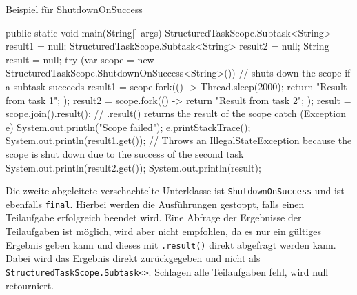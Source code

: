     \begin{program} [H]
        \caption{Beispiel für ShutdownOnSuccess}
        \label{prog:BeispielFürShutdownSuccess}
    \begin{JavaCode}[language=Java, numbers=left]
public static void main(String[] args) {
    StructuredTaskScope.Subtask<String> result1 = null;
    StructuredTaskScope.Subtask<String> result2 = null;
    String result = null;
    try (var scope = new StructuredTaskScope.ShutdownOnSuccess<String>()) {                 // shuts down the scope if a subtask succeeds
        result1 = scope.fork(() -> {
            Thread.sleep(2000);
            return "Result from task 1";
        });
        result2 = scope.fork(() -> {
            return "Result from task 2";
        });
        result = scope.join().result();      // .result() returns the result of the scope
    } catch (Exception e) {
        System.out.println("Scope failed");
        e.printStackTrace();
    }
    System.out.println(result1.get());            // Throws an IllegalStateException because the scope is shut down due to the success of the second task
    System.out.println(result2.get());
    System.out.println(result);
}\end{JavaCode}
    \end{program}
    Die zweite abgeleitete verschachtelte Unterklasse ist \texttt{ShutdownOnSuccess} und ist ebenfalls \texttt{final}. Hierbei werden die Ausführungen gestoppt, falls
    einen Teilaufgabe erfolgreich beendet wird. Eine Abfrage der Ergebnisse der Teilaufgaben ist möglich, wird aber nicht empfohlen, da es nur ein gültiges
    Ergebnis geben kann
    und dieses mit \texttt{.result()} direkt abgefragt werden kann. Dabei wird das Ergebnis direkt zurückgegeben und nicht als \texttt{StructuredTaskScope.Subtask<>}.
    Schlagen alle Teilaufgaben fehl, wird null retourniert.




